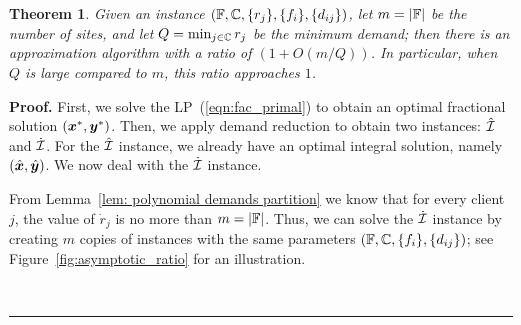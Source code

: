 \documentclass[oneside,final]{ucr}
\newtheorem{theorem}{Theorem}
\newenvironment{proof}[1][Proof]{\textbf{#1.} }{\ \rule{0.5em}{0.5em}}
\def\ssp{\def\baselinestretch{1.0}\large\normalsize}
\begin{document}
\begin{theorem}
  \label{thm:largeR}
  Given an {\FTFP} instance $(\mathbb{F},\mathbb{C},\{r_j\},
  \{f_i\}, \{d_{ij}\})$, let $m = |\mathbb{F}|$ be the number
  of sites, and let $Q = \min_{j\in\mathbb{C}} r_j$ be the
  minimum demand; then there is an approximation algorithm
  with a ratio of $(1 + O(m/Q))$. In particular, when $Q$ is
  large compared to $m$, this ratio approaches $1$.
\end{theorem}
\begin{proof}
  First, we solve the LP~(\ref{eqn:fac_primal}) to obtain an
  optimal fractional solution $(\boldsymbol{x}^\ast,
  \boldsymbol{y}^\ast)$. Then, we apply demand reduction to obtain two
  instances: $\hat {\mathcal{I}}$ and $\dot {\mathcal{I}}$. For the $\hat
  {\mathcal{I}}$ instance, we already have an optimal integral
  solution, namely $(\hat{\boldsymbol{x}},\hat{\boldsymbol{y}})$. We now deal with
  the $\dot{\mathcal{I}}$ instance.

  From Lemma~\ref{lem: polynomial demands partition} we know
  that for every client $j$, the value of $\dot r_j$ is no
  more than $m=|\mathbb{F}|$. Thus, we can solve the $\dot
  {\mathcal{I}}$ instance by creating $m$ copies of {\UFL} instances
  with the same parameters $(\mathbb{F}, \mathbb{C}, \{f_i\},
  \{d_{ij}\})$; see Figure~\ref{fig:asymptotic_ratio} for an
  illustration.  

  \ssp
  \begin{figure}[ht]
    \centering
\end{figure}
\end{proof}
\end{document}
